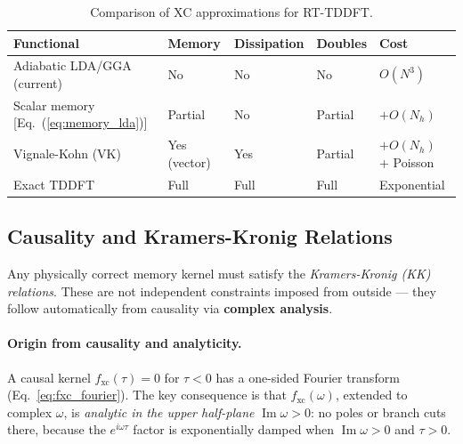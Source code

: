 \documentclass[12pt,letterpaper]{article}
\newcommand{\fxc}{f_{\mathrm{xc}}}
\theoremstyle{definition}
\begin{document}
\begin{table}[ht]
\centering
\caption{Comparison of XC approximations for RT-TDDFT.}
\begin{tabular}{@{}lllll@{}}
\toprule
Functional & Memory & Dissipation & Doubles & Cost \\
\midrule
Adiabatic LDA/GGA (current) & No & No & No & $O(N^3)$ \\
Scalar memory [Eq.~(\ref{eq:memory_lda})] & Partial & No & Partial & $+O(N_h)$ \\
Vignale-Kohn (VK) & Yes (vector) & Yes & Partial & $+O(N_h)$ + Poisson \\
Exact TDDFT & Full & Full & Full & Exponential \\
\bottomrule
\end{tabular}
\end{table}

\subsection{Causality and Kramers-Kronig Relations}

Any physically correct memory kernel must satisfy the
\emph{Kramers-Kronig (KK) relations}.
These are not independent constraints imposed from outside --- they
follow automatically from causality via \textbf{complex analysis}.

\paragraph{Origin from causality and analyticity.}
A causal kernel $\fxc(\tau)=0$ for $\tau<0$ has a one-sided Fourier
transform (Eq.~\ref{eq:fxc_fourier}).
The key consequence is that $\fxc(\omega)$, extended to complex $\omega$,
is \emph{analytic in the upper half-plane} $\operatorname{Im}\omega > 0$:
no poles or branch cuts there, because the $e^{i\omega\tau}$ factor
is exponentially damped when $\operatorname{Im}\omega>0$ and $\tau>0$.
\end{document}
